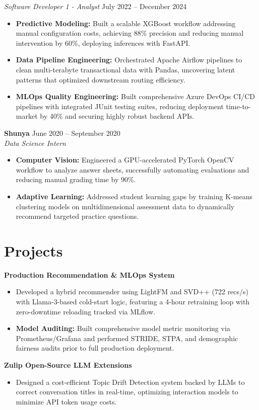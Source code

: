 \documentclass[11pt,a4paper]{article}
\begin{document}
\vspace{3pt}
\noindent
\textit{Software Developer 1 - Analyst} \hfill July 2022 -- December 2024
\begin{itemize}[leftmargin=*,noitemsep,topsep=0pt]
    \item \textbf{Predictive Modeling:} Built a scalable XGBoost workflow addressing manual configuration costs, achieving 88\% precision and reducing manual intervention by 60\%, deploying inferences with FastAPI.
    \item \textbf{Data Pipeline Engineering:} Orchestrated Apache Airflow pipelines to clean multi-terabyte transactional data with Pandas, uncovering latent patterns that optimized downstream routing efficiency.
    \item \textbf{MLOps Quality Engineering:} Built comprehensive Azure DevOps CI/CD pipelines with integrated JUnit testing suites, reducing deployment time-to-market by 40\% and securing highly robust backend APIs.
\end{itemize}

\vspace{3pt}
\noindent
\textbf{Shunya} \hfill June 2020 -- September 2020 \\
\textit{Data Science Intern}
\begin{itemize}[leftmargin=*,noitemsep,topsep=0pt]
    \item \textbf{Computer Vision:} Engineered a GPU-accelerated PyTorch OpenCV workflow to analyze answer sheets, successfully automating evaluations and reducing manual grading time by 90\%.
    \item \textbf{Adaptive Learning:} Addressed student learning gaps by training K-means clustering models on multidimensional assessment data to dynamically recommend targeted practice questions.
\end{itemize}

\vspace{-5pt}
\section{Projects}
\noindent
\textbf{Production Recommendation \& MLOps System}
\begin{itemize}[leftmargin=*,noitemsep,topsep=0pt]
    \item Developed a hybrid recommender using LightFM and SVD++ (722 recs/s) with Llama-3-based cold-start logic, featuring a 4-hour retraining loop with zero-downtime reloading tracked via MLflow.
    \item \textbf{Model Auditing:} Built comprehensive model metric monitoring via Prometheus/Grafana and performed STRIDE, STPA, and demographic fairness audits prior to full production deployment.
\end{itemize}

\vspace{3pt}
\noindent
\textbf{Zulip Open-Source LLM Extensions}
\begin{itemize}[leftmargin=*,noitemsep,topsep=0pt]
    \item Designed a cost-efficient Topic Drift Detection system backed by LLMs to correct conversation titles in real-time, optimizing interaction models to minimize API token usage costs.
\end{itemize}
\end{document}
